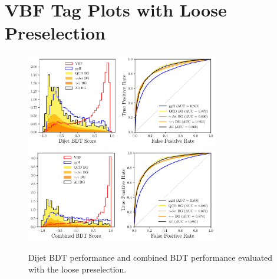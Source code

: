 
\chapter{VBF Tag Plots with Loose Preselection}
\label{appendix:vbf_loose_ps}
%
\begin{figure}[h!]
    \begin{center}
        \includegraphics[width=0.75\textwidth]{figures/appendix_VBFLPS/dijet_BDT_LPS.pdf}
        \includegraphics[width=0.75\textwidth]{figures/appendix_VBFLPS/combined_BDT_LPS.pdf}
    \end{center}
    \caption{Dijet BDT performance and combined BDT performance evaluated with the loose preselection.}
    \label{fig:vbf_lps_appendix:combined_bdt_performance}
\end{figure}
%
